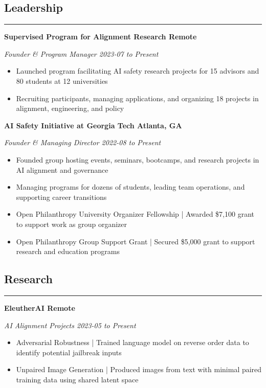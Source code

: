 \documentclass{article}
\newcommand{\headingOne}[1]{
    \subsection*{#1} \hrule
    \vspace*{6pt}
}
\newcommand{\headingTwo}[2]{
    \vspace*{6pt}
    \textbf{#1 \hfill #2}
}
\newcommand{\headingThree}[2]{
    \vspace*{2pt}
    \textsl{#1 \hfill #2}
}
\begin{document}
\headingOne{Leadership}


\headingTwo{Supervised Program for Alignment Research}{Remote}

\headingThree{Founder \& Program Manager}{2023-07 to Present}
\begin{itemize}
    \item Launched program facilitating AI safety research projects for 15 advisors and 80 students at 12 universities
    \item Recruiting participants, managing applications, and organizing 18 projects in alignment, engineering, and policy
\end{itemize}


\headingTwo{AI Safety Initiative at Georgia Tech}{Atlanta, GA}

\headingThree{Founder \& Managing Director}{2022-08 to Present}
\begin{itemize}
    \item Founded group hosting events, seminars, bootcamps, and research projects in AI alignment and governance
    \item Managing programs for dozens of students, leading team operations, and supporting career transitions
    \item Open Philanthropy University Organizer Fellowship | Awarded \$7,100 grant to support work as group organizer
    \item Open Philanthropy Group Support Grant | Secured \$5,000 grant to support research and education programs
\end{itemize}





\headingOne{Research}


\headingTwo{EleutherAI}{Remote}

\headingThree{AI Alignment Projects}{2023-05 to Present}
\begin{itemize}
    \item Adversarial Robustness | Trained language model on reverse order data to identify potential jailbreak inputs
    \item Unpaired Image Generation | Produced images from text with minimal paired training data using shared latent space
\end{itemize}
\end{document}
